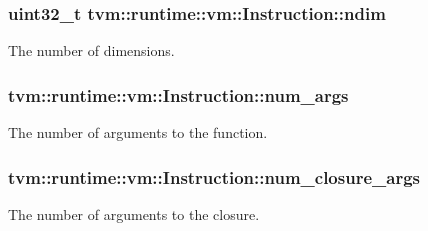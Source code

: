\subsubsection[{\texorpdfstring{ndim}{ndim}}]{\setlength{\rightskip}{0pt plus 5cm}uint32\+\_\+t tvm\+::runtime\+::vm\+::\+Instruction\+::ndim}\hypertarget{structtvm_1_1runtime_1_1vm_1_1Instruction_a173d5883d5721b633350c0bfc24122b9}{}\label{structtvm_1_1runtime_1_1vm_1_1Instruction_a173d5883d5721b633350c0bfc24122b9}


The number of dimensions. 

\subsubsection[{\texorpdfstring{num\+\_\+args}{num_args}}]{ tvm\+::runtime\+::vm\+::\+Instruction\+::num\+\_\+args}\hypertarget{structtvm_1_1runtime_1_1vm_1_1Instruction_a5d98a3b5b50e6fa9029d05f741c0bce9}{}\label{structtvm_1_1runtime_1_1vm_1_1Instruction_a5d98a3b5b50e6fa9029d05f741c0bce9}


The number of arguments to the function. 

\subsubsection[{\texorpdfstring{num\+\_\+closure\+\_\+args}{num_closure_args}}]{ tvm\+::runtime\+::vm\+::\+Instruction\+::num\+\_\+closure\+\_\+args}\hypertarget{structtvm_1_1runtime_1_1vm_1_1Instruction_ad4b0bb0bc9012b8e34c6fd621390532f}{}\label{structtvm_1_1runtime_1_1vm_1_1Instruction_ad4b0bb0bc9012b8e34c6fd621390532f}


The number of arguments to the closure. 

